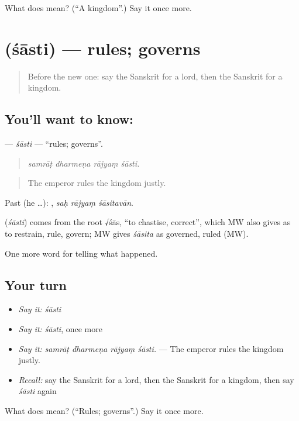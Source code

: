 \begin{tcolorbox}[breakable,colback=teal!4,colframe=teal!35!black,title={Before you move on}]
What does  mean? (\textquotedblleft{}A kingdom\textquotedblright{}.) Say it once more.
\end{tcolorbox}
\section[\texorpdfstring{\sk{शास्ति} (śāsti)}{शास्ति (śāsti)}]{ (śāsti) — rules; governs}

\label{lesson:SA-C316-sasti}



\begin{quote}
Before the new one: say the Sanskrit for a lord, then the Sanskrit for a kingdom.
\end{quote}

\subsection*{You'll want to know: }
\textbf{} — \emph{śāsti} — \textquotedblleft{}rules; governs\textquotedblright{}.

\begin{quote}
   
\end{quote}

\begin{quote}
\emph{samrāṭ dharmeṇa rājyaṃ śāsti.}
\end{quote}

\begin{quote}
The emperor rules the kingdom justly.
\end{quote}

Past (he …):   , \emph{saḥ rājyaṃ śāsitavān}.

\begin{cousinweb}
\textbf{} (\emph{śāsti}) comes from the root √śās, \textquotedblleft{}to chastise, correct\textquotedblright{}, which MW also gives as to restrain, rule, govern; MW gives \emph{śāsita} as governed, ruled (MW).
\end{cousinweb}

\begin{grammarlens}[title={What you've built}]
One more word for telling what happened.
\end{grammarlens}

\subsection*{Your turn}
\begin{itemize}
\raggedright
  \item \emph{Say it:} \emph{śāsti}
  \item \emph{Say it:} \emph{śāsti}, once more
  \item \emph{Say it:} \emph{samrāṭ dharmeṇa rājyaṃ śāsti.} — The emperor rules the kingdom justly.
  \item \emph{Recall:} say the Sanskrit for a lord, then the Sanskrit for a kingdom, then say \emph{śāsti} again
\end{itemize}

\begin{tcolorbox}[breakable,colback=teal!4,colframe=teal!35!black,title={Before you move on}]
What does  mean? (\textquotedblleft{}Rules; governs\textquotedblright{}.) Say it once more.
\end{tcolorbox}
